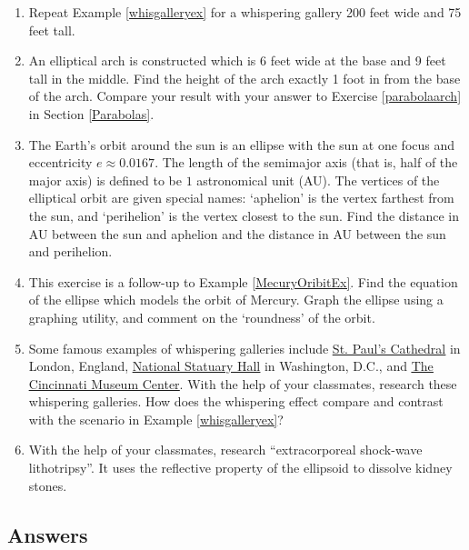 \begin{enumerate}
\setcounter{enumi}{\value{HW}}

\item  Repeat Example \ref{whisgalleryex} for a whispering gallery 200 feet wide and 75 feet tall.

\item \label{ellipsearchex} An elliptical arch is constructed which is 6 feet wide at the base and 9 feet tall in the middle. Find the height of the arch exactly 1 foot in from the base of the arch. Compare your result with your answer to Exercise \ref{parabolaarch} in Section \ref{Parabolas}.

\item The Earth's orbit around the sun is an ellipse with the sun at one focus and eccentricity $e \approx 0.0167$.  The length of the semimajor axis (that is, half of the major axis) is defined to be $1$ astronomical unit (AU).  The vertices of the elliptical orbit are given special names: `aphelion' is the vertex farthest from the sun, and  `perihelion' is the vertex closest to the sun.  Find the distance in AU between the sun and aphelion and the distance in AU between the sun and perihelion.

\item  \label{MercuryOrbitGraph}  This exercise is a follow-up to Example \ref{MecuryOribitEx}.  Find the equation of the ellipse which models the orbit of Mercury.  Graph the ellipse using a graphing utility, and comment on the `roundness' of the orbit.


\item Some famous examples of whispering galleries include \href{http://www.stpauls.co.uk/}{\underline{St. Paul's Cathedral}} in London, England, \href{http://www.aoc.gov/cc/capitol/nat_stat_hall.cfm}{\underline{National Statuary Hall}} in Washington, D.C.,  and \href{http://www.cincymuseum.org/}{\underline{The Cincinnati Museum Center}}. With the help of your classmates, research these whispering galleries.  How does the whispering effect compare and contrast with the scenario in Example  \ref{whisgalleryex}?

\item With the help of your classmates, research ``extracorporeal shock-wave lithotripsy''.  It uses the reflective property of the ellipsoid to dissolve kidney stones.

\end{enumerate}

\newpage

\subsection{Answers}

